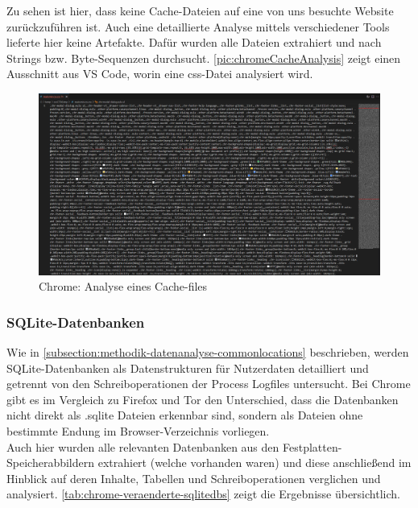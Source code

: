\begin{appendices}
Zu sehen ist hier, dass keine Cache-Dateien auf eine von uns besuchte Website zurückzuführen ist. Auch eine detaillierte Analyse mittels verschiedener Tools lieferte hier keine Artefakte. Dafür wurden alle Dateien extrahiert und nach Strings bzw. Byte-Sequenzen durchsucht. \autoref{pic:chromeCacheAnalysis} zeigt einen Ausschnitt aus VS Code, worin eine css-Datei analysiert wird. 

\begin{figure}[h!]
	\centering
	\includegraphics[width=\textwidth]{bilder/CacheChromeAnalyse.png}
	\caption{Chrome: Analyse eines Cache-files}
	\label{pic:chromeCacheAnalysis}
\end{figure}

\subsubsection*{SQLite-Datenbanken}\label{chap:anhang-chrome-common-sqlite}

Wie in \autoref{subsection:methodik-datenanalyse-commonlocations} beschrieben, werden SQLite-Datenbanken als Datenstrukturen für Nutzerdaten
detailliert und getrennt von den Schreiboperationen der Process Logfiles untersucht. Bei Chrome gibt es im Vergleich zu Firefox und Tor den Unterschied, dass die Datenbanken nicht direkt als .sqlite Dateien erkennbar sind, sondern als Dateien ohne bestimmte Endung im Browser-Verzeichnis vorliegen. \\ 
Auch hier wurden alle relevanten Datenbanken aus den Festplatten-Speicherabbildern extrahiert (welche vorhanden waren) und diese anschließend im Hinblick auf deren Inhalte, Tabellen und Schreiboperationen verglichen und analysiert. \autoref{tab:chrome-veraenderte-sqlitedbs} zeigt die Ergebnisse übersichtlich.


\end{appendices}
